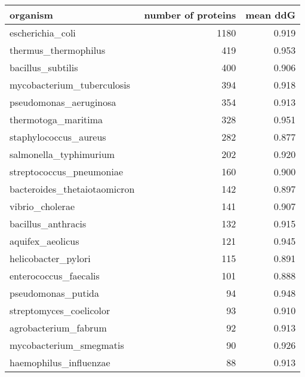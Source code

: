 \begin{tabular}{lrr}
\toprule
                                    organism &  number of proteins &  mean ddG \\
\midrule
                            escherichia\_coli &                1180 &     0.919 \\
                        thermus\_thermophilus &                 419 &     0.953 \\
                           bacillus\_subtilis &                 400 &     0.906 \\
                  mycobacterium\_tuberculosis &                 394 &     0.918 \\
                      pseudomonas\_aeruginosa &                 354 &     0.913 \\
                         thermotoga\_maritima &                 328 &     0.951 \\
                       staphylococcus\_aureus &                 282 &     0.877 \\
                      salmonella\_typhimurium &                 202 &     0.920 \\
                    streptococcus\_pneumoniae &                 160 &     0.900 \\
                bacteroides\_thetaiotaomicron &                 142 &     0.897 \\
                             vibrio\_cholerae &                 141 &     0.907 \\
                          bacillus\_anthracis &                 132 &     0.915 \\
                            aquifex\_aeolicus &                 121 &     0.945 \\
                         helicobacter\_pylori &                 115 &     0.891 \\
                       enterococcus\_faecalis &                 101 &     0.888 \\
                          pseudomonas\_putida &                  94 &     0.948 \\
                     streptomyces\_coelicolor &                  93 &     0.910 \\
                        agrobacterium\_fabrum &                  92 &     0.913 \\
                     mycobacterium\_smegmatis &                  90 &     0.926 \\
                      haemophilus\_influenzae &                  88 &     0.913 \\

\end{tabular}
